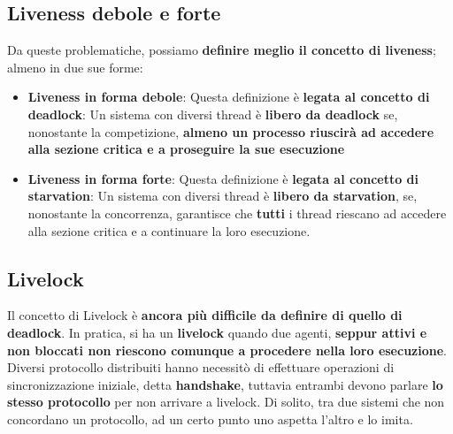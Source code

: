 \documentclass[12pt]{article}
\begin{document}
\subsection{Liveness debole e forte}
Da queste problematiche, possiamo \textbf{definire meglio il concetto di liveness}; almeno in due sue forme:
\begin{itemize}
    \item \textbf{Liveness in forma debole}: Questa definizione è \textbf{legata al concetto di deadlock}: Un sistema con diversi thread è \textbf{libero da deadlock} se, nonostante la competizione, \textbf{almeno un processo riuscirà ad accedere alla sezione critica e a proseguire la sue esecuzione}
    \item \textbf{Liveness in forma forte}: Questa definizione è \textbf{legata al concetto di starvation}: Un sistema con diversi thread è \textbf{libero da starvation}, se, nonostante la concorrenza, garantisce che \textbf{tutti} i thread riescano ad accedere alla sezione critica e a continuare la loro esecuzione.
\end{itemize}
\subsection{Livelock}
Il concetto di Livelock è \textbf{ancora più difficile da definire di quello di deadlock}. In pratica, si ha un \textbf{livelock} quando due agenti, \textbf{seppur attivi e non bloccati non riescono comunque a procedere nella loro esecuzione}. Diversi protocollo distribuiti hanno necessitò di effettuare operazioni di sincronizzazione iniziale, detta \textbf{handshake}, tuttavia entrambi devono parlare \textbf{lo stesso protocollo} per non arrivare a livelock. Di solito, tra due sistemi che non concordano un protocollo, ad un certo punto uno aspetta l'altro e lo imita.
\end{document}
